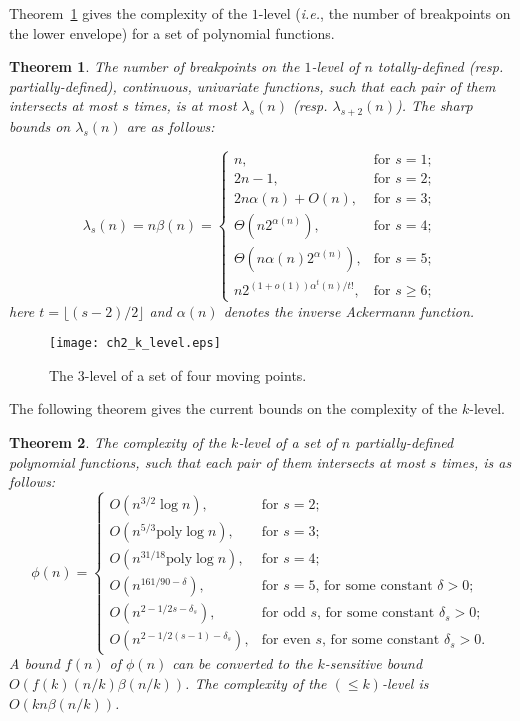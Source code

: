 \documentclass[preprint,12pt]{elsarticle}
\newcommand{\ie}{\emph{i.e.}}
\newtheorem{theorem}{Theorem}[section]
\begin{document}
Theorem~\ref{the:totallyDFcomplexity} gives the complexity of the $1$-level (\ie, the number of breakpoints on the lower envelope) for a set of polynomial functions.  

\begin{theorem}\label{the:totallyDFcomplexity}{\tt \cite{Pettie:2013:SBD:2493132.2462390,Agarwal:1995:DSG:868483}}
The number of breakpoints on the $1$-level of $n$ totally-defined (resp. partially-defined), continuous, univariate  functions, such that each pair of them intersects at most $s$ times, is at most $\lambda_s(n)$ (resp. $\lambda_{s+2}(n)$). The sharp bounds on $\lambda_s(n)$ are as follows:

\[
\lambda_s(n) =n\beta(n) =
\begin{cases}
        {n},  & \text{for $s=1$};\\
        {2n-1},  & \text{for $s=2$};\\
        {2n\alpha(n)+O(n)},  & \text{for $s=3$};\\
        {\Theta(n2^{\alpha(n)})},  & \text{for $s=4$};\\
        {\Theta(n\alpha(n)2^{\alpha(n)})},  & \text{for $s=5$};\\
        {n2^{(1+o(1))\alpha^t(n)/t!}}, & \text{for $s\geq 6$};
\end{cases}
\]
here $t={\lfloor {(s-2)/2}\rfloor}$ and  $\alpha(n)$ denotes the inverse Ackermann function.
\end{theorem}

\begin{figure}[h]
\centering
\texttt{[image: ch2\_k\_level.eps]}
\caption{The $3$-level of a set of four moving points.}
\label{fig:k_level}
\end{figure}

The following theorem gives the current bounds on the complexity of the $k$-level.

\begin{theorem}\label{the:k_levelComplexity}{\tt \cite{AACS1998,chanii2005,Chan:2008:LAC:1377676.1377691,SharirM1991}}
The complexity of the $k$-level of a set of $n$ partially-defined polynomial functions, such that each pair of them intersects at most $s$ times, is as follows:
\[
\phi(n) = 
\begin{cases}
        {O(n^{3/2} \log n)},  & \text{for $s=2$};\\
        {O(n^{5/3} \text{poly}\log n)},  & \text{for $s=3$};\\
        {O(n^{31/18} \text{poly}\log n)},  & \text{for $s=4$};\\
        {O(n^{161/90-\delta})},  & \text{for $s=5$, for some constant $\delta>0$};\\
        {O(n^{2-1/2s-\delta_s})},  & \text{for odd $s$, for some constant $\delta_s>0$};\\
        {O(n^{2-1/2(s-1)-\delta_s})}, & \text{for even $s$, for some constant $\delta_s>0$}.
\end{cases}
\]
A bound $f(n)$ of $\phi(n)$ can be converted to the $k$-sensitive bound $O(f(k)(n/k)\beta(n/k))$. The complexity of the $(\leq k)$-level is $O(kn\beta(n/k))$. \end{theorem}
\end{document}
